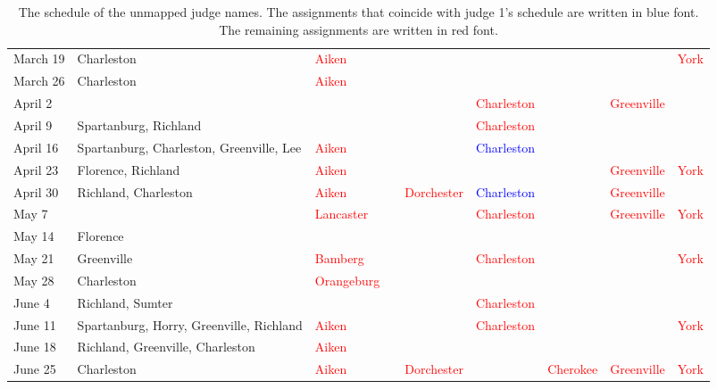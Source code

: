\documentclass[11pt, oneside]{article}   	%
\theoremstyle{ModifiedStyle}
\begin{document}
\begin{table}[H]
{\begin{tabular}{L{23mm}C{55mm}C{16mm}C{20mm}C{16mm}C{15mm}C{15mm}C{26mm}C{8mm}}
			March 19 &  Charleston & \textcolor{red}{Aiken} & & & & & &  \textcolor{red}{York} \\
			March 26 &  Charleston & \textcolor{red}{Aiken} & & & & & &\\
			April 2 & & & & &  \textcolor{red}{Charleston} & &  \textcolor{red}{Greenville} &\\
			April 9 &  Spartanburg, Richland & & & &  \textcolor{red}{Charleston} & & &\\
			April 16 &  Spartanburg, Charleston, Greenville, Lee & \textcolor{red}{Aiken} & & &  \textcolor{blue}{Charleston} & & &\\
			April 23 &  Florence, Richland & \textcolor{red}{Aiken} & & & & &  \textcolor{red}{Greenville} &  \textcolor{red}{York} \\
			April 30 &  Richland, Charleston & \textcolor{red}{Aiken} & &  \textcolor{red}{Dorchester} &  \textcolor{blue}{Charleston} & &  \textcolor{red}{Greenville} &\\
			May 7 & & \textcolor{red}{Lancaster} & & &  \textcolor{red}{Charleston} & &  \textcolor{red}{Greenville} &  \textcolor{red}{York} \\
			May 14 &  Florence & & & & & & &\\
			May 21 &  Greenville & \textcolor{red}{Bamberg} & & &  \textcolor{red}{Charleston} & & &  \textcolor{red}{York} \\
			May 28 &  Charleston & \textcolor{red}{Orangeburg} & & & & & &\\
			June 4 &  Richland, Sumter & & & &  \textcolor{red}{Charleston} & & &\\
			June 11 &  Spartanburg, Horry, Greenville, Richland & \textcolor{red}{Aiken} & & &  \textcolor{red}{Charleston} & & &  \textcolor{red}{York} \\
			June 18 &  Richland, Greenville, Charleston & \textcolor{red}{Aiken} & & & & & &\\
			June 25 &  Charleston & \textcolor{red}{Aiken} & &  \textcolor{red}{Dorchester} & &  \textcolor{red}{Cherokee} &  \textcolor{red}{Greenville} &  \textcolor{red}{York} \\
			\bottomrule
		\end{tabular}
	}
	\caption{The schedule of the unmapped judge names. The assignments that coincide with judge 1's schedule are written in blue font. The remaining assignments are written in red font.}
	\label{Table_Schedule_Of_Unmapped_Judge_Names}
\end{table}

\clearpage
\end{document}
